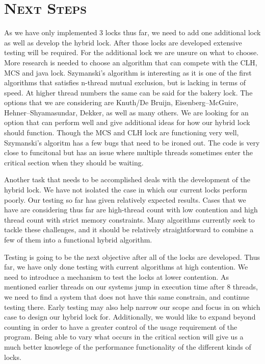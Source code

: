 \documentclass[CheckpointReport.tex]{subfiles}
\begin{document}
\bigskip

\section*{\textsc{\Large Next Steps}}

As we have only implemented 3 locks thus far, we need to add one additional lock as well as develop the hybrid lock. After those locks are developed extensive testing will be required.
For the additional lock we are unsure on what to choose. More research is needed to choose an algorithm that can compete with the CLH, MCS and java lock. Szymanski's algorithm is interesting
 as it is one of the first algorithms that satisfies n-thread mutual exclusion, but is lacking in terms of speed. At higher thread numbers the same can be said for the bakery lock.
The options that we are considering are Knuth/De Bruijn, Eisenberg–McGuire, Hehner–Shyamasundar, Dekker, as well as many others. We are looking for an option that can perform well and give additional ideas for how our hybrid lock should function. Though the MCS and CLH lock are functioning very well, Szymanski's algoritm has a few bugs that need to be ironed out. The code is very close to funcitonal but has an issue where multiple threads sometimes enter the critical section when they should be waiting.

Another task that needs to be accomplished deals with the development of the hybrid lock. We have not isolated the case in which our current locks perform poorly. Our testing so far has given relatively expected results. Cases that we have are considering thus far are high-thread count with low contention and high thread count with strict memory constraints. Many algorithms currently seek to tackle these challenges, and it should be relatively straightforward to combine a few of them into a functional hybrid algorithm.

Testing is going to be the next objective after all of the locks are developed. Thus far, we have only done testing with current algorithms at high contention. We need to introduce a mechanism to test the locks at lower contention. As mentioned earlier threads on our systems jump in execution time after 8 threads, we need to find a system that does not have this same constrain, and continue testing there. Early testing may also help narrow our scope and focus in on which case to design our hybrid lock for. Additionally, we would like to expand beyond counting in order to have a greater control of the usage requirement of the program. Being able to vary what occurs in the critical section will give us a much better knowlege of the performance functionality of the different kinds of locks.
\end{document}
